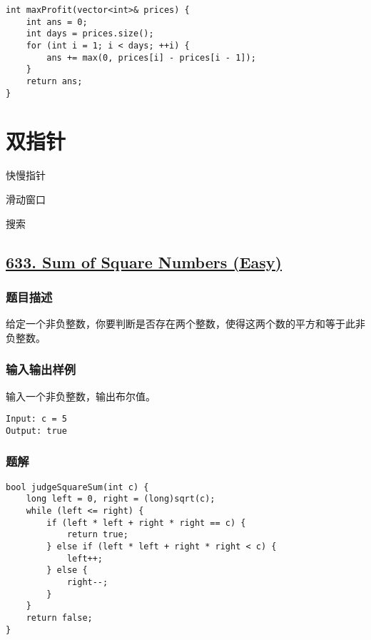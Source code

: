 \documentclass[lang=cn,10pt]{elegantbook}
\begin{document}
\begin{lstlisting}
int maxProfit(vector<int>& prices) {   
	int ans = 0;
	int days = prices.size();
	for (int i = 1; i < days; ++i) {
		ans += max(0, prices[i] - prices[i - 1]);
	}
	return ans;
}
\end{lstlisting}

\chapter{双指针}

\begin{introduction}[前情提要]
	\item 快慢指针
	\item 滑动窗口
	\item 搜索
\end{introduction}

{\color{red}\section{\href{https://leetcode.cn/problems/sum-of-square-numbers/}{633. Sum of Square Numbers (Easy)}}} \label{ch3.633}

\subsection*{题目描述}

给定一个非负整数，你要判断是否存在两个整数，使得这两个数的平方和等于此非负整数。

\subsection*{输入输出样例}

输入一个非负整数，输出布尔值。

\begin{lstlisting}
Input: c = 5
Output: true
\end{lstlisting}

\subsection*{题解}

\begin{lstlisting}
bool judgeSquareSum(int c) {
	long left = 0, right = (long)sqrt(c);
	while (left <= right) {
		if (left * left + right * right == c) {
			return true;
		} else if (left * left + right * right < c) {
			left++;
		} else {
			right--;
		}
	}
	return false;
}
\end{lstlisting}
\end{document}
